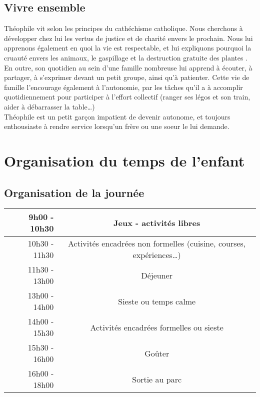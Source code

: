 \documentclass[french]{article}
\begin{document}
\subsection{Vivre ensemble}
		Théophile vit selon les principes du cathéchisme catholique. Nous cherchons à développer chez lui les vertus de justice et de charité envers le prochain. Nous lui apprenons également en quoi la vie est respectable, et lui expliquons pourquoi  la cruauté envers les animaux, le gaspillage et la destruction gratuite des plantes .\\
		
			En outre, son quotidien au sein d'une famille nombreuse lui apprend à écouter, à partager, à s'exprimer devant un petit groupe, ainsi qu'à patienter. Cette vie de famille l'encourage également à l'autonomie, par les tâches qu'il a à accomplir quotidiennement pour participer à l'effort collectif (ranger ses légos et son train, aider à débarrasser la table\ldots{})\\
		
		Théophile est un petit garçon impatient de devenir autonome, et toujours enthousiaste à rendre service lorsqu'un frère ou une soeur le lui demande. 
	
	\section{Organisation du temps de l'enfant}

\subsection{Organisation de la journée}


\begin{tabular}{|r|c|}
	\hline
	9h00 - 10h30 & Jeux - activités libres \\
	\hline
	10h30 - 11h30 & Activités encadrées non formelles (cuisine, courses, expériences\ldots{}) \\
	\hline
	11h30 - 13h00 & Déjeuner \\
	\hline
	13h00 - 14h00 & Sieste ou temps calme \\
	\hline
	14h00 - 15h30 & Activités encadrées formelles ou sieste  \\
	\hline
	15h30 - 16h00 & Goûter \\
	\hline
	16h00 - 18h00 & Sortie au parc \\
	\hline
\end{tabular}
\end{document}

